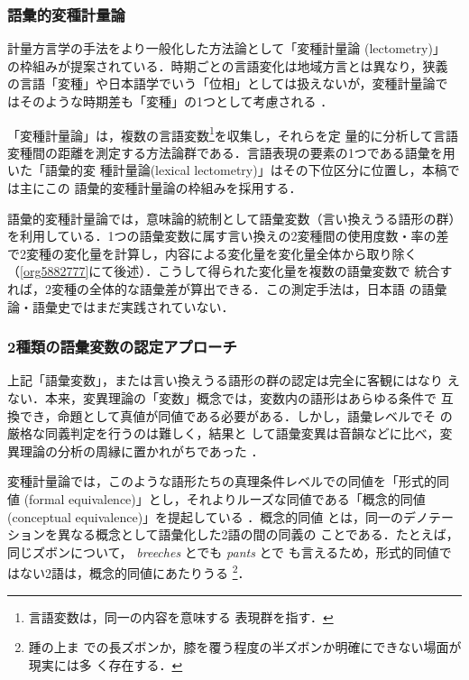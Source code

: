 \documentclass[submit]{ipsj}
\renewcommand{\ref}{\cref}
\begin{document}
\subsubsection{語彙的変種計量論\label{org1e5ba31}}
\label{sec:orgaac9699}
計量方言学の手法をより一般化した方法論として「変種計量論 (lectometry)」
の枠組みが提案されている．時期ごとの言語変化は地域方言とは異なり，狭義
の言語「変種」や日本語学でいう「位相」としては扱えないが，変種計量論で
はそのような時期差も「変種」の1つとして考慮される
\cite{Geeraerts2023Lexical}．

「変種計量論」は，複数の言語変数\footnote{言語変数は，同一の内容を意味する
表現群を指す\cite{Labov1972Sociolinguistic}．}を収集し，それらを定
量的に分析して言語変種間の距離を測定する方法論群である\cite{Ruette2014Semantic}．言語表現の要素の1つである語彙を用いた「語彙的変
種計量論(lexical lectometry)」はその下位区分に位置し，本稿では主にこの
語彙的変種計量論の枠組みを採用する．

語彙的変種計量論では，意味論的統制として語彙変数（言い換えうる語形の群）
を利用している．1つの語彙変数に属す言い換えの2変種間の使用度数・率の差
で2変種の変化量を計算し，内容による変化量を変化量全体から取り除く
（\ref{org5882777}にて後述）．こうして得られた変化量を複数の語彙変数で
統合すれば，2変種の全体的な語彙差が算出できる．この測定手法は，日本語
の語彙論・語彙史ではまだ実践されていない．
\subsubsection{2種類の語彙変数の認定アプローチ}
\label{sec:orgaddaf0a}
上記「語彙変数」，または言い換えうる語形の群の認定は完全に客観にはなり
えない．本来，変異理論の「変数」概念では，変数内の語形はあらゆる条件で
互換でき，命題として真値が同値である必要がある．しかし，語彙レベルでそ
の厳格な同義判定を行うのは難しく\cite{Lavandera1978Where}，結果と
して語彙変異は音韻などに比べ，変異理論の分析の周縁に置かれがちであった
\cite{DePascale2019Tokenbased}．

変種計量論では，このような語形たちの真理条件レベルでの同値を「形式的同
値 (formal equivalence)」とし，それよりルーズな同値である「概念的同値
(conceptual equivalence)」を提起している
\cite{Geeraerts2023Lexical,DePascale2019Tokenbased}．概念的同値
とは，同一のデノテーションを異なる概念として語彙化した2語の間の同義の
ことである．たとえば，同じズボンについて， \emph{breeches} とでも \emph{pants} とで
も言えるため，形式的同値ではない2語は，概念的同値にあたりうる
\cite{DePascale2019Tokenbased,Geeraerts2023Lexical}\footnote{踵の上ま
での長ズボンか，膝を覆う程度の半ズボンか明確にできない場面が現実には多
く存在する．}．
\end{document}
